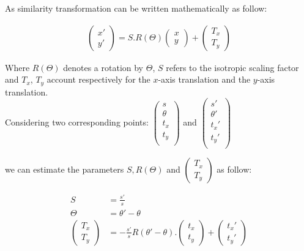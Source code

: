 \documentclass{article}
\begin{document}
As similarity transformation can be written mathematically as follow:

\begin{align*}
\begin{pmatrix} 
x' \\
y'
\end{pmatrix}
= S.R(\Theta)
\begin{pmatrix} 
x \\
y
\end{pmatrix}
+
\begin{pmatrix} 
T_x \\
T_y
\end{pmatrix}
\end{align*}

Where $R(\Theta)$ denotes a rotation by $\Theta$, $S$ refers to the isotropic scaling factor and $T_x$, $T_y$ account respectively for the $x$-axis translation and the $y$-axis translation. \\

Considering two corresponding points: $\begin{pmatrix} 
s \\
\theta \\
t_x \\
t_y \\
\end{pmatrix}$
and
$\begin{pmatrix} 
s' \\
\theta' \\
t_x' \\
t_y' \\
\end{pmatrix}$

we can estimate the parameters $S, R(\Theta)$ and $\begin{pmatrix} 
T_x \\
T_y
\end{pmatrix}$ as follow:

\begin{align*}
S & = \frac{s'}{s} \\
\Theta & = \theta' - \theta \\
\begin{pmatrix} 
T_x \\
T_y
\end{pmatrix} & =
- \frac{s'}{s}R(\theta' - \theta).
\begin{pmatrix} 
t_x \\
t_y
\end{pmatrix} + 
\begin{pmatrix} 
t_x' \\
t_y'
\end{pmatrix}
\end{align*}
\end{document}
